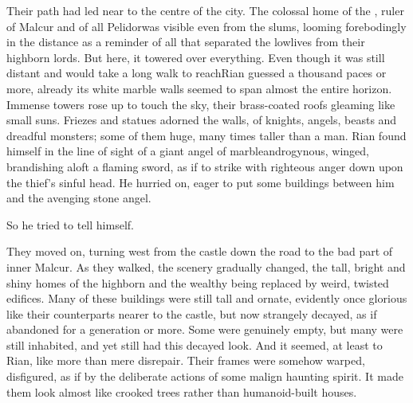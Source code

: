 \begin{garbage}
Their path had led near to the centre of the city. The colossal \CastlePelidor{}\dash home of the \rayuth, ruler of Malcur and of all Pelidor\dash was visible even from the slums, looming forebodingly in the distance as a reminder of all that separated the lowlives from their highborn lords. But here, it towered over everything. Even though it was still distant and would take a long walk to reach\dash Rian guessed a thousand paces or more\dash, already its white marble walls seemed to span almost the entire horizon. Immense towers rose up to touch the sky, their brass-coated roofs gleaming like small suns. 
Friezes and statues adorned the walls, of \armoured knights, angels, beasts and dreadful monsters; some of them huge, many times taller than a man. 
Rian found himself in the line of sight of a giant angel of marble\dash androgynous, winged, brandishing aloft a flaming sword, as if to strike with righteous anger down upon the thief's sinful head. He hurried on, eager to put some buildings between him and the avenging stone angel. 

 So he tried to tell himself. 









% 









They moved on, turning west from the castle down the road to the bad part of inner Malcur.  As they walked, the scenery gradually changed, the tall, bright and shiny homes of the highborn and the wealthy being replaced by weird, twisted edifices. Many of these buildings were still tall and ornate, evidently once glorious like their counterparts nearer to the castle, but now strangely decayed, as if abandoned for a generation or more. Some were genuinely empty, but many were still inhabited, and yet still had this decayed look. 
And it seemed, at least to Rian, like more than mere disrepair. Their frames were somehow warped, disfigured, as if by the deliberate actions of some malign haunting spirit. It made them look almost like crooked trees rather than humanoid-built houses. 


\end{garbage}
